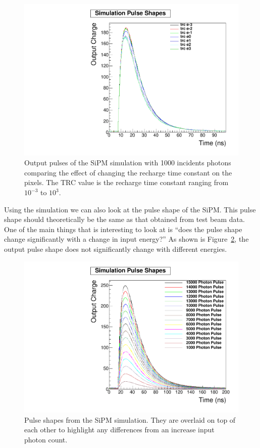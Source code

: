 \begin{figure}
\centering
\includegraphics[width=0.8\linewidth]{Figures/trc.pdf}
\caption{Output pulses of the SiPM simulation with 1000 incidents photons comparing the effect of changing the recharge time constant on the pixels. The TRC value is the recharge time constant ranging from $10^{-3}$ to $10^3$.}
\label{fig:trc}
\end{figure}

Using the simulation we can also look at the pulse shape of the SiPM. This pulse shape should theoretically be the same as that obtained from test beam data. One of the main things that is interesting to look at is ``does the pulse shape change significantly with a change in input energy?'' As shown is Figure~\ref{fig:SimPul}, the output pulse shape does not significantly change with different energies.

\begin{figure}
\centering
\includegraphics[width=0.8\linewidth]{Figures/SimPul.pdf}
\caption{Pulse shapes from the SiPM simulation. They are overlaid on top of each other to highlight any differences from an increase input photon count.}
\label{fig:SimPul}
\end{figure}

